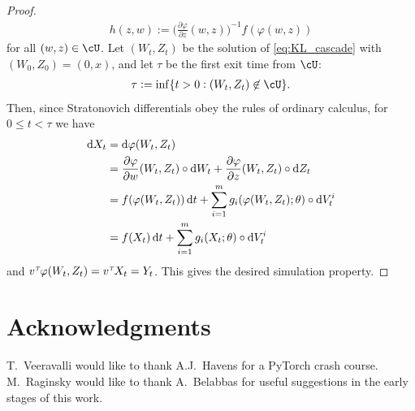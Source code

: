 \documentclass[letterpaper, 10pt, conference]{ieeeconf}
\def\trn{{\hbox{\it\tiny T}}} %
\def\deq{:=}
\begin{document}
\begin{proof}
\begin{align*}
	h(z,w) \deq \bigg(\frac{\partial \varphi}{\partial z}(w,z)\bigg)^{-1} f(\varphi(w,z))
\end{align*}
for all $(w,z) \in \cU$. Let $(W_t,Z_t)$ be the solution of \eqref{eq:KL_cascade} with $(W_0,Z_0) = (0,x)$, and let $\tau$ be the first exit time from $\cU$:
\begin{align*}
	\tau  \deq \inf \{ t > 0 : (W_t,Z_t) \not\in \cU \}.
\end{align*}
Then, since Stratonovich differentials obey the rules of ordinary calculus, for $0 \le t < \tau$ we have
\begin{align*}
	\dif X_t &= \dif \varphi(W_t,Z_t) \\
	&= \frac{\partial \varphi}{\partial w}(W_t,Z_t) \circ \dif W_t + \frac{\partial \varphi}{\partial z}(W_t,Z_t) \circ \dif Z_t \\
	&= f(\varphi(W_t,Z_t)) \dif t + \sum^m_{i=1} g_i(\varphi(W_t,Z_t); \theta) \circ \dif V^i_t \\
	&= f(X_t) \dif t + \sum^m_{i=1} g_i(X_t; \theta) \circ \dif V^i_t
\end{align*}
and $v^\trn \varphi(W_t,Z_t) = v^\trn X_t = Y_t$. This gives the desired simulation property.
\end{proof}

\section*{Acknowledgments}

T.~Veeravalli would like to thank A.J.~Havens for a PyTorch crash course. M.~Raginsky would like to thank A.~Belabbas for useful suggestions in the early stages of this work.


\end{document}
